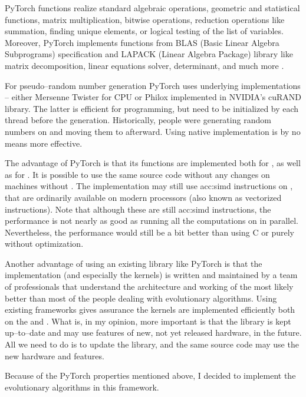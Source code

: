 PyTorch functions realize standard algebraic operations, geometric and statistical functions, matrix multiplication, bitwise operations, reduction operations like summation, finding unique elements, or logical testing of the list of variables. Moreover, PyTorch implements functions from BLAS (Basic Linear Algebra Subprograms) specification and LAPACK (Linear Algebra Package) library like matrix decomposition, linear equations solver, determinant, and much more \citep{PyTorchDoc}.

For pseudo--random number generation PyTorch uses underlying implementations -- either Mersenne Twister for CPU or Philox implemented in NVIDIA's cuRAND library. The latter is efficient for \cuda programming, but need to be initialized by each thread before the generation. Historically, people were generating random numbers on \cpu and moving them to \gpu afterward. Using native \cuda implementation is by no means more effective.

The advantage of PyTorch is that its functions are implemented both for \cpuns, as well as for \gpuns. It is possible to use the same source code without any changes on machines without \gpuns. The implementation may still use \acrshort{acc:simd} instructions on \cpuns, that are ordinarily available on modern processors (also known as vectorized instructions). Note that although these are still \acrshort{acc:simd} instructions, the performance is not nearly as good as running all the computations on \gpu in parallel. Nevertheless, the performance would still be a bit better than using C or \cpp purely without optimization.

Another advantage of using an existing library like PyTorch is that the implementation (and especially the \cuda kernels) is written and maintained by a team of professionals that understand the architecture and working of the \gpu most likely better than most of the people dealing with evolutionary algorithms. Using existing frameworks gives assurance the kernels are implemented efficiently both on the \gpu and \cpuns. What is, in my opinion, more important is that the library is kept up--to--date and may use features of new, not yet released hardware, in the future. All we need to do is to update the library, and the same source code may use the new hardware and features.

Because of the PyTorch properties mentioned above, I decided to implement the evolutionary algorithms in this framework.




